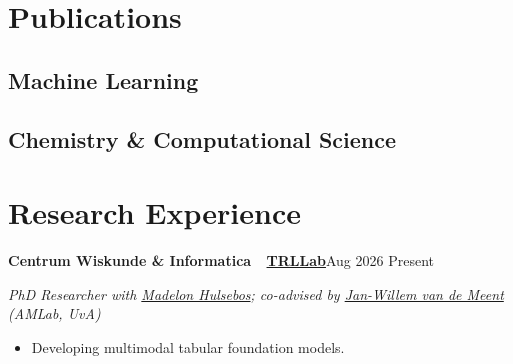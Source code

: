 \documentclass[10pt,letterpaper]{article}
\newcommand{\sansfam}{\sffamily}
\newcommand{\bdash}{\,\textemdash\,}
\newcommand{\datestamp}[1]{{\sansfam\footnotesize\color{meta}\figureversion{lf}#1}}
\newcommand{\role}[2]{%
  \filbreak%
  \par\vspace{1pt}%
  \noindent\textbf{#1}\hfill\datestamp{#2}\par\nopagebreak}
\newcommand{\sub}[1]{\noindent\textit{\footnotesize\color{meta} #1}\par\nopagebreak}
\begin{document}
\section{Publications}

\nocite{*}

\subsection{Machine Learning}
\printbibliography[heading=none, keyword=ml]

\subsection{Chemistry \& Computational Science}
\printbibliography[heading=none, keyword=chem]

\section{Research Experience}

\role{Centrum Wiskunde \& Informatica \bdash{} \href{https://trl-lab.github.io/}{TRLLab}}{Aug 2026 \textendash{} Present}
\sub{PhD Researcher with \href{https://madelonhulsebos.github.io/}{Madelon Hulsebos}; co-advised by \href{https://jwvdm.github.io/}{Jan-Willem van de Meent} (AMLab, UvA)}
\begin{itemize}
  \item Developing multimodal tabular foundation models.
\end{itemize}
\end{document}
